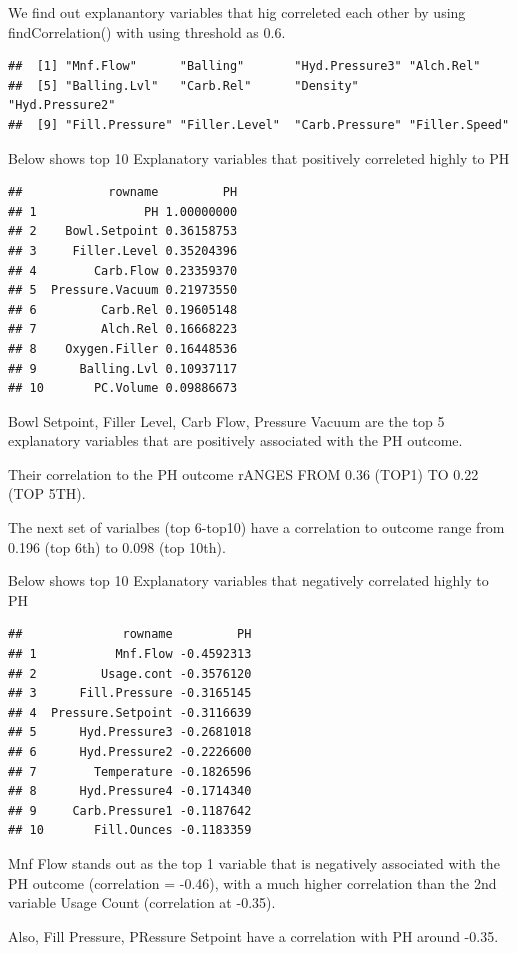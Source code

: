 \documentclass[]{article}
\begin{document}
We find out explanantory variables that hig correleted each other by
using findCorrelation() with using threshold as 0.6.

\begin{verbatim}
##  [1] "Mnf.Flow"      "Balling"       "Hyd.Pressure3" "Alch.Rel"     
##  [5] "Balling.Lvl"   "Carb.Rel"      "Density"       "Hyd.Pressure2"
##  [9] "Fill.Pressure" "Filler.Level"  "Carb.Pressure" "Filler.Speed"
\end{verbatim}

Below shows top 10 Explanatory variables that positively correleted
highly to PH

\begin{verbatim}
##            rowname         PH
## 1               PH 1.00000000
## 2    Bowl.Setpoint 0.36158753
## 3     Filler.Level 0.35204396
## 4        Carb.Flow 0.23359370
## 5  Pressure.Vacuum 0.21973550
## 6         Carb.Rel 0.19605148
## 7         Alch.Rel 0.16668223
## 8    Oxygen.Filler 0.16448536
## 9      Balling.Lvl 0.10937117
## 10       PC.Volume 0.09886673
\end{verbatim}

Bowl Setpoint, Filler Level, Carb Flow, Pressure Vacuum are the top 5
explanatory variables that are positively associated with the PH
outcome.

Their correlation to the PH outcome rANGES FROM 0.36 (TOP1) TO 0.22 (TOP
5TH).

The next set of varialbes (top 6-top10) have a correlation to outcome
range from 0.196 (top 6th) to 0.098 (top 10th).

Below shows top 10 Explanatory variables that negatively correlated
highly to PH

\begin{verbatim}
##              rowname         PH
## 1           Mnf.Flow -0.4592313
## 2         Usage.cont -0.3576120
## 3      Fill.Pressure -0.3165145
## 4  Pressure.Setpoint -0.3116639
## 5      Hyd.Pressure3 -0.2681018
## 6      Hyd.Pressure2 -0.2226600
## 7        Temperature -0.1826596
## 8      Hyd.Pressure4 -0.1714340
## 9     Carb.Pressure1 -0.1187642
## 10       Fill.Ounces -0.1183359
\end{verbatim}

Mnf Flow stands out as the top 1 variable that is negatively associated
with the PH outcome (correlation = -0.46), with a much higher
correlation than the 2nd variable Usage Count (correlation at -0.35).

Also, Fill Pressure, PRessure Setpoint have a correlation with PH around
-0.35.
\end{document}
